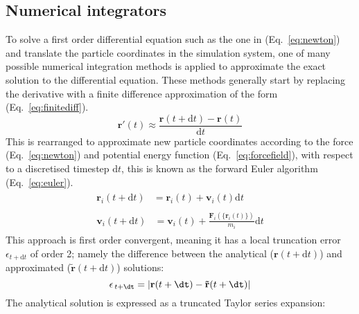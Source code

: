 \subsection{Numerical integrators} \label{sec:integrators}
%
%
To solve a first order differential equation such as the one in (Eq.~\ref{eq:newton}) and translate the particle coordinates in the simulation system, one of many possible numerical integration methods is applied to approximate the exact solution to the differential equation. These methods generally start by replacing the derivative with a finite difference approximation of the form (Eq.~\ref{eq:finitediff}). 
%
\begin{equation} \label{eq:finitediff}
    \mathbf{r}'(t) \approx \frac{\mathbf{r}(t+\mathrm{d}t) - \mathbf{r}(t)}{\mathrm{d}t}
\end{equation}
This is rearranged to approximate new particle coordinates according to the force (Eq.~\ref{eq:newton}) and potential energy function (Eq.~\ref{eq:forcefield}), with respect to a discretised timestep $\mathrm{d}t$, this is known as the forward Euler algorithm (Eq.~\ref{eq:euler}).
%
\begin{subequations} \label{eq:euler}
\begin{align}
\begin{split}
    \mathbf{r}_i(t+\mathrm{d}t) &=  \mathbf{r}_i(t) +  \mathbf{v}_i(t)\mathrm{d}t
\end{split}\\
\begin{split}
    \mathbf{v}_i(t+\mathrm{d}t) &=  \mathbf{v}_i(t) + \frac{\mathbf{F}_i(\{\mathbf{r}_i(t)\})}{m_i}\mathrm{d}t
\end{split}
\end{align}
\end{subequations}
%
This approach is first order convergent, meaning it has a local truncation error $\epsilon_{t+\mathrm{d}t}$ of order 2; namely the difference between the analytical ($\mathbf{r}(t+\mathrm{d}t)$) and approximated ($\mathbf{\tilde{r}}(t+\mathrm{d}t)$) solutions:
\begin{equation}
    \epsilon_{\,t+\dt} = \left|\mathbf{r}(t+\dt) - \mathbf{\tilde{r}}(t+\dt)\right|
\end{equation}
The analytical solution is expressed as a truncated Taylor series expansion:
